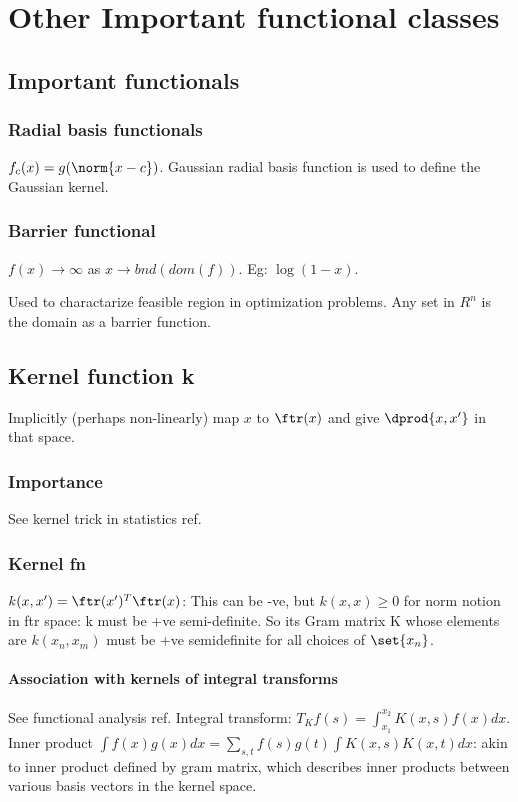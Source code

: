 \documentclass[oneside, article]{memoir}
\begin{document}
\chapter{Other Important functional classes}
\section{Important functionals}
\subsection{Radial basis functionals}
$f_{c}(x) = g(\norm{x - c})$. Gaussian radial basis function is used to define the Gaussian kernel.

\subsection{Barrier functional}
$f(x) \to \infty$ as $x \to bnd(dom(f))$. Eg: $\log (1-x)$.

Used to charactarize feasible region in optimization problems. Any set in $R^{n}$ is the domain as a barrier function.

\section{Kernel function k}
Implicitly (perhaps non-linearly) map $x$ to $\ftr(x)$ and give $\dprod{x, x'}$ in that space.

\subsection{Importance}
See kernel trick in statistics ref.

\subsection{Kernel fn}
$k(x, x') = \ftr(x')^{T} \ftr(x)$: This can be -ve, but $k(x, x) \geq 0$ for norm notion in ftr space: k must be +ve semi-definite. So its Gram matrix K whose elements are $k(x_{n}, x_{m})$ must be +ve semidefinite for all choices of $\set{x_{n}}$.

\subsubsection{Association with kernels of integral transforms}
See functional analysis ref. Integral transform: $T_{K}f(s) = \int_{x_{1}}^{x_{2}}K(x,s)f(x)dx$. Inner product $\int f(x)g(x)dx = \sum_{s,t} f(s)g(t)\int K(x,s)K(x,t)dx$: akin to inner product defined by gram matrix, which describes inner products between various basis vectors in the kernel space.
\end{document}

